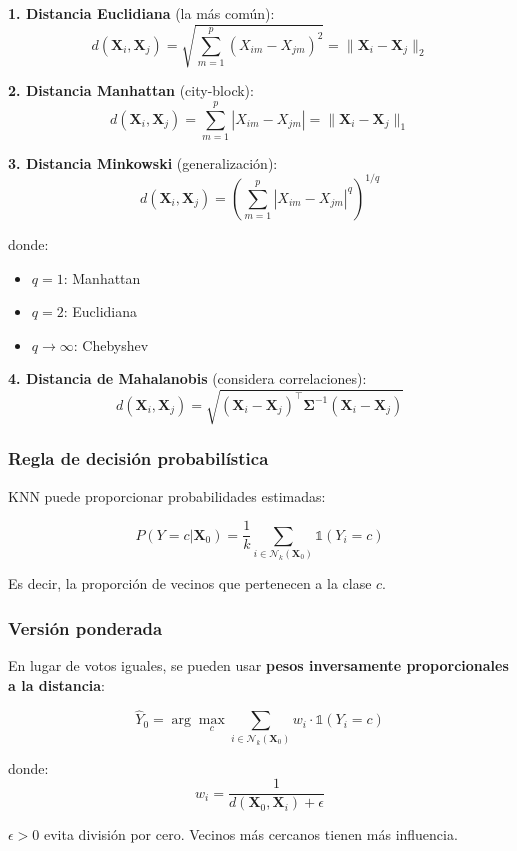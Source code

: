 \documentclass[
  doc,
  floatsintext,
  longtable,
  a4paper,
  nolmodern,
  notxfonts,
  notimes,
  12pt,
  colorlinks=true,linkcolor=blue,citecolor=blue,urlcolor=blue]{apa7}
\providecommand{\tightlist}{%
  \setlength{\itemsep}{0pt}\setlength{\parskip}{0pt}}
\begin{document}
\textbf{1. Distancia Euclidiana} (la más común): \[
d(\mathbf{X}_i, \mathbf{X}_j) = \sqrt{\sum_{m=1}^{p} (X_{im} - X_{jm})^2} = \|\mathbf{X}_i - \mathbf{X}_j\|_2
\]

\textbf{2. Distancia Manhattan} (city-block): \[
d(\mathbf{X}_i, \mathbf{X}_j) = \sum_{m=1}^{p} |X_{im} - X_{jm}| = \|\mathbf{X}_i - \mathbf{X}_j\|_1
\]

\textbf{3. Distancia Minkowski} (generalización): \[
d(\mathbf{X}_i, \mathbf{X}_j) = \left(\sum_{m=1}^{p} |X_{im} - X_{jm}|^q\right)^{1/q}
\]

donde:

\begin{itemize}
\tightlist
\item
  \(q = 1\): Manhattan
\item
  \(q = 2\): Euclidiana
\item
  \(q \to \infty\): Chebyshev
\end{itemize}

\textbf{4. Distancia de Mahalanobis} (considera correlaciones): \[
d(\mathbf{X}_i, \mathbf{X}_j) = \sqrt{(\mathbf{X}_i - \mathbf{X}_j)^\top \mathbf{\Sigma}^{-1} (\mathbf{X}_i - \mathbf{X}_j)}
\]

\subsubsection{Regla de decisión
probabilística}\label{regla-de-decisiuxf3n-probabiluxedstica}

KNN puede proporcionar probabilidades estimadas:

\[
P(Y = c | \mathbf{X}_0) = \frac{1}{k} \sum_{i \in \mathcal{N}_k(\mathbf{X}_0)} \mathbb{1}(Y_i = c)
\]

Es decir, la proporción de vecinos que pertenecen a la clase \(c\).

\subsubsection{Versión ponderada}\label{versiuxf3n-ponderada}

En lugar de votos iguales, se pueden usar \textbf{pesos inversamente
proporcionales a la distancia}:

\[
\hat{Y}_0 = \arg\max_{c} \sum_{i \in \mathcal{N}_k(\mathbf{X}_0)} w_i \cdot \mathbb{1}(Y_i = c)
\]

donde: \[
w_i = \frac{1}{d(\mathbf{X}_0, \mathbf{X}_i) + \epsilon}
\]

\(\epsilon > 0\) evita división por cero. Vecinos más cercanos tienen
más influencia.
\end{document}
